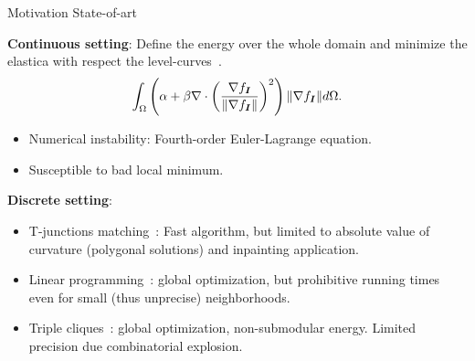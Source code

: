 \begin{frame}
{Motivation}
{State-of-art}

\textbf{Continuous setting}: Define the energy over the whole domain and minimize the elastica with respect the level-curves~\cite{chan02elasticainpainting}.
%
\begin{align*}
\int_{\Omega}{ \left(\alpha + \beta \nabla \cdot \left(\frac{\nabla f_{\bm{I}}}{\lVert\nabla f_{\bm{I}} \rVert}\right) ^2 \right)\lVert\nabla f_{\bm{I}} \rVert d\Omega}.
\end{align*}
%
\pause
\begin{itemize}
\item{Numerical instability: Fourth-order Euler-Lagrange equation.}
\item{Susceptible to bad local minimum.}
\end{itemize}
%
\pause
\vspace{1em}
\textbf{Discrete setting}:

\begin{itemize}
\item{T-junctions matching~\cite{masnou98inpainting}: Fast algorithm, but limited to absolute value of curvature (polygonal solutions) and inpainting application.}\pause
\item{Linear programming~\cite{schoenemann09linear}: global optimization, but prohibitive running times even for small (thus unprecise) neighborhoods.}\pause
\item{Triple cliques~\cite{nieuwenhuis14efficient}: global optimization, non-submodular energy. Limited precision due combinatorial explosion.}
\end{itemize}
\end{frame}

